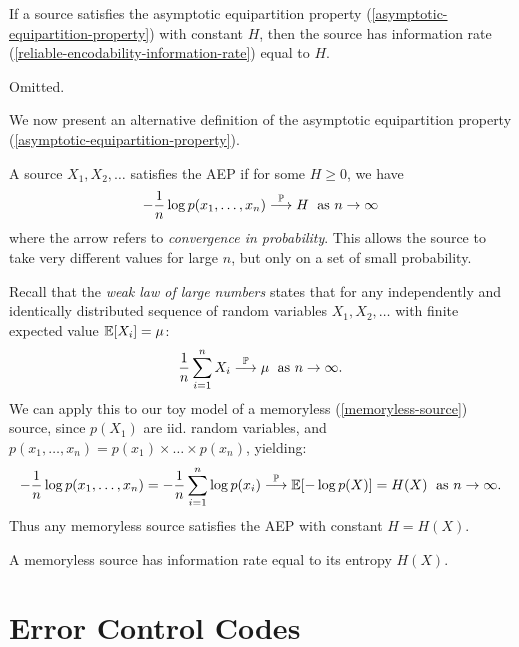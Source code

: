 \documentclass{article}
\begin{document}
\begin{theorem}
    If a source satisfies the asymptotic equipartition property (\ref{asymptotic-equipartition-property}) with constant $H$, then the source has information rate (\ref{reliable-encodability-information-rate}) equal to $H$.
\end{theorem}
\begin{prf}
    Omitted.
\end{prf}

We now present an alternative definition of the asymptotic equipartition property (\ref{asymptotic-equipartition-property}).

\begin{definition}
    A source $X_1, X_2, \dots$ satisfies the AEP if for some $H \geq 0$, we have
    \[
	- \frac{1}{n} \log p(x_1, \dots, x_n) \stackrel{\mathbb{P}}{\longrightarrow} H \; \text{ as $n \to \infty$}
	\]
	where the arrow refers to \textit{convergence in probability}. This allows the source to take very different values for large $n$, but only on a set of small probability.
\end{definition}

\begin{remark}
    Recall that the \textit{weak law of large numbers} states that for any independently and identically distributed sequence of random variables $X_1, X_2, \dots$ with finite expected value $\mathbb{E}[X_i] = \mu$:
    \[
	\frac{1}{n} \sum_{i=1}^n X_i \stackrel{\mathbb{P}}{\longrightarrow} \mu \; \text{ as $n \to \infty$}.
	\]
	We can apply this to our toy model of a memoryless (\ref{memoryless-source}) source, since $p(X_1)$ are iid. random variables, and $p(x_1, \dots, x_n) = p(x_1) \times \dots \times p(x_n)$, yielding:
	\[
	- \frac{1}{n} \log p(x_1, \dots, x_n) = -\frac{1}{n} \sum_{i=1}^n \log p(x_i) \stackrel{\mathbb{P}}{\longrightarrow} \mathbb{E}[-\log p(X)] = H(X) \; \text{ as $n \to \infty$}.
	\]
	Thus any memoryless source satisfies the AEP with constant $H = H(X)$.
\end{remark}

\begin{corollary}
    A memoryless source has information rate equal to its entropy $H(X)$.
\end{corollary}


\pagebreak
\section{Error Control Codes}
\end{document}
